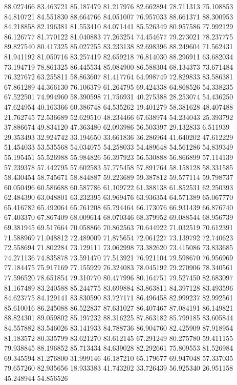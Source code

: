 88.027466
83.463721
85.187479
81.217976
82.662894
78.711313
75.108853
84.810721
84.551830
88.664766
84.051007
76.957033
88.661371
88.300953
84.218858
82.196381
81.553410
84.071441
85.526349
80.957586
77.992129
86.126777
81.770122
81.040883
77.263254
74.454677
79.273021
78.237775
89.827540
80.417325
85.027255
83.233138
82.698396
88.249604
71.562431
81.941192
81.050716
83.257419
82.659218
76.814030
88.296911
63.682034
73.194719
78.861325
86.445534
85.084900
86.588304
68.134373
73.671484
76.327672
63.255811
58.863607
81.417764
64.998749
72.829833
83.586381
67.861289
44.366130
76.106379
61.264795
69.424338
64.868526
54.338235
67.522501
74.994960
58.390598
71.756931
40.275388
28.253074
54.436250
47.624954
40.163366
60.386748
64.535262
19.401279
58.381628
48.407488
21.762745
72.536689
52.629510
48.234466
67.638974
54.234043
25.393792
37.886674
49.834120
47.363480
62.093986
56.503397
29.132833
6.511939
29.353493
32.924742
33.194650
33.661836
36.286964
41.640202
47.612229
51.454033
53.535568
54.034075
54.258033
54.489648
54.561286
54.839349
55.195451
55.526988
55.984826
56.397923
56.530888
56.866899
57.114139
57.239378
57.442795
57.602583
57.775458
57.891764
58.158128
58.331585
58.430454
58.745671
58.844887
59.223689
59.387812
59.577114
59.798737
60.050496
60.586688
60.587786
61.109722
61.388138
61.852531
62.250393
62.484390
63.048801
63.232395
63.969476
63.936354
64.571389
65.067770
65.416782
65.492064
65.761208
65.794464
66.173076
66.931439
66.876740
67.403370
67.867409
68.009614
68.070346
68.379952
69.088544
68.956739
69.381945
69.517664
70.058866
70.862563
70.644922
71.032519
70.612391
71.588969
71.048812
72.489009
71.875654
72.061227
73.139792
72.740623
72.558694
71.802284
73.129111
73.062998
73.382620
73.415086
73.833685
74.271136
74.835878
73.591470
77.513921
76.921104
79.598670
76.956969
77.184475
75.917169
77.155929
76.324083
78.045192
79.270906
78.340561
77.596520
78.651854
79.310770
80.477996
80.164751
79.527450
82.683097
81.167489
83.240588
85.244775
83.699884
83.863811
84.397128
83.493596
84.623775
84.129141
83.830590
83.727171
86.496458
82.999237
82.992561
85.610016
86.245088
86.522837
87.631027
86.407467
87.084191
86.149821
88.824301
89.059802
85.197232
88.316225
87.863182
85.799185
83.605844
84.557882
83.546026
83.141933
84.788736
86.904760
82.425909
87.918954
81.183572
80.335799
83.621270
83.612145
67.291249
80.275780
59.411155
79.938845
88.196852
85.713434
84.639028
82.292661
75.809553
81.526984
69.345594
81.276800
31.999146
46.187210
65.179677
69.947048
57.337035
79.657260
82.935656
18.933383
41.743202
33.726439
56.925340
26.951158
45.248944
54.856526
